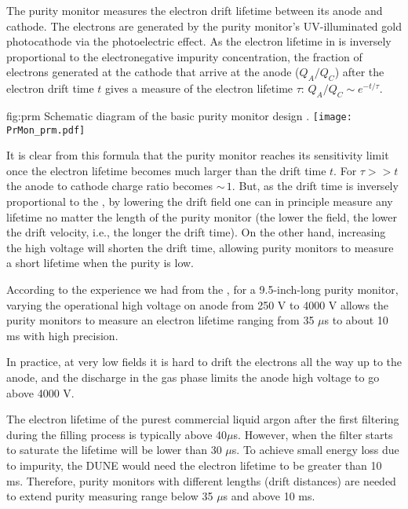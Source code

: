 The purity monitor measures the electron drift lifetime between its anode and cathode. The electrons are generated by the purity monitor's UV-illuminated gold photocathode via the photoelectric effect. As the electron lifetime in \lar is inversely proportional to the electronegative impurity concentration, the fraction of electrons generated at the cathode that arrive at the anode ($Q_A/Q_C$) after the electron drift time $t$ gives a measure of the electron lifetime $\tau$:
%
\( Q_A/Q_C \sim e^{-t/\tau}.\)



\begin{dunefigure}{fig:prm}
  {Schematic diagram of the basic purity monitor design \cite{Adamowski:2014daa}.}
  \texttt{[image: PrMon\_prm.pdf]}
\end{dunefigure}


%

It is clear from this formula that the purity monitor reaches its sensitivity limit once the electron lifetime becomes much larger than the drift time $t$. For $\tau >> t$ the anode to cathode charge ratio becomes $\sim\,1$. But, as the drift time is inversely proportional to the \efield, by lowering the drift field one can in principle measure any lifetime no matter the length of the purity monitor (the lower the field, the lower the drift velocity, i.e., the longer the drift time). On the other hand, increasing the high voltage will shorten the drift time, allowing purity monitors to measure a short lifetime when the purity is low. 

According to the experience we had from the , for a 9.5-inch-long purity monitor, varying the operational high voltage on anode from 250 V to 4000 V allows the purity monitors to measure an electron lifetime ranging from 35 $\mu$s to about 10 ms with high precision. 

In practice, at very low fields it is hard to drift the electrons all the way up to the anode, and the discharge in the gas phase limits the anode high voltage to go above 4000 V. 

The electron lifetime of the purest commercial liquid argon after the first filtering during the filling process is typically above 40$\mu$s. However, when the filter starts to saturate the lifetime will be lower than 30 $\mu$s.  To achieve small energy loss due to impurity,  the DUNE  would need the electron lifetime to be greater than 10 ms. Therefore, purity monitors with different lengths (drift distances) are needed to extend purity measuring range below 35 $\mu$s and above 10 ms.

